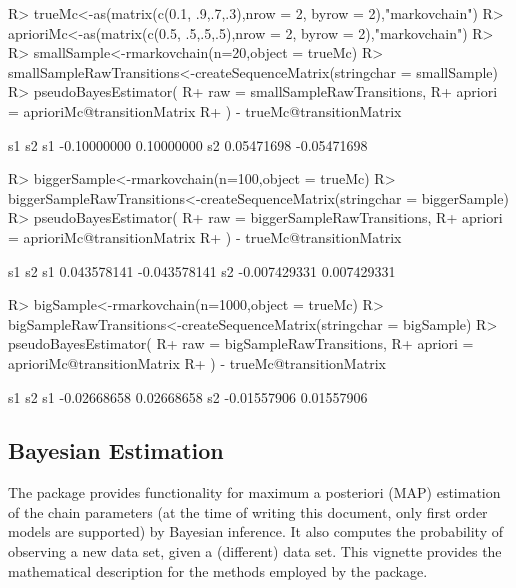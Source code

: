 \documentclass[
  nojss]{jss}
\begin{document}
\begin{CodeChunk}

\begin{CodeInput}
R> trueMc<-as(matrix(c(0.1, .9,.7,.3),nrow = 2, byrow = 2),"markovchain")
R> aprioriMc<-as(matrix(c(0.5, .5,.5,.5),nrow = 2, byrow = 2),"markovchain")
R> 
R> smallSample<-rmarkovchain(n=20,object = trueMc)
R> smallSampleRawTransitions<-createSequenceMatrix(stringchar = smallSample)
R> pseudoBayesEstimator(
R+   raw = smallSampleRawTransitions, 
R+   apriori = aprioriMc@transitionMatrix
R+ ) - trueMc@transitionMatrix
\end{CodeInput}

\begin{CodeOutput}
            s1          s2
s1 -0.10000000  0.10000000
s2  0.05471698 -0.05471698
\end{CodeOutput}

\begin{CodeInput}
R> biggerSample<-rmarkovchain(n=100,object = trueMc)
R> biggerSampleRawTransitions<-createSequenceMatrix(stringchar = biggerSample)
R> pseudoBayesEstimator(
R+   raw = biggerSampleRawTransitions,
R+   apriori = aprioriMc@transitionMatrix
R+ ) - trueMc@transitionMatrix
\end{CodeInput}

\begin{CodeOutput}
             s1           s2
s1  0.043578141 -0.043578141
s2 -0.007429331  0.007429331
\end{CodeOutput}

\begin{CodeInput}
R> bigSample<-rmarkovchain(n=1000,object = trueMc)
R> bigSampleRawTransitions<-createSequenceMatrix(stringchar = bigSample)
R> pseudoBayesEstimator(
R+   raw = bigSampleRawTransitions,
R+   apriori = aprioriMc@transitionMatrix
R+ ) - trueMc@transitionMatrix
\end{CodeInput}

\begin{CodeOutput}
            s1         s2
s1 -0.02668658 0.02668658
s2 -0.01557906 0.01557906
\end{CodeOutput}
\end{CodeChunk}

\hypertarget{bayesian-estimation}{%
\subsection{Bayesian Estimation}\label{bayesian-estimation}}

The  package provides functionality for maximum a posteriori (MAP) estimation of the chain parameters (at the time of writing this document, only first order models are supported) by Bayesian inference. It also computes the probability of observing a new data set, given a (different) data set. This vignette provides the mathematical description for the methods employed by the package.
\end{document}
